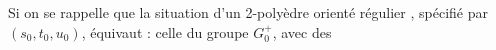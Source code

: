 
Si on se rappelle que la situation d'un 2-polyèdre orienté  régulier , spécifié par $(s_0,t_0,u_0)$, équivaut : celle du groupe $G_0^+$, avec des
